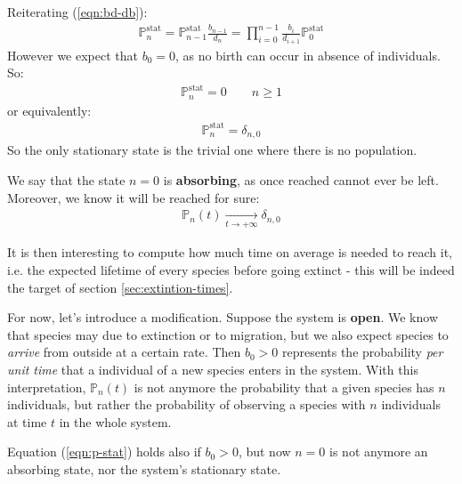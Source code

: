 \documentclass[../../main.tex]{subfiles}
\begin{document}
\medskip

Reiterating (\ref{eqn:bd-db}):
\begin{align}\label{eqn:p-stat}
    \mathbb{P}_{n}^{\mathrm{stat}} = \mathbb{P}_{n-1}^{\mathrm{stat}} \frac{b_{n-1}}{d_n} = \prod_{i=0}^{n-1} \frac{b_i}{d_{i+1}}   \mathbb{P}_0^{\mathrm{stat}}
\end{align}
However we expect that $b_0 = 0$, as no birth can occur in absence of individuals. So:
\begin{align*}
    \mathbb{P}_{n}^{\mathrm{stat}} = 0 \qquad n \geq 1
\end{align*}
or equivalently:
\begin{align*}
    \mathbb{P}_{n}^{\mathrm{stat}} = \delta_{n,0}
\end{align*}
So the only stationary state is the trivial one where there is no population.

\medskip

We say that the state $n=0$ is \textbf{absorbing}, as once reached cannot ever be left. Moreover, we know it will be reached for sure:
\begin{align*}
    \mathbb{P}_n(t)  \xrightarrow[t \to +\infty]{}  \delta_{n,0}
\end{align*}

It is then interesting to compute how much time on average is needed to reach it, i.e. the expected lifetime of every species before going extinct - this will be indeed the target of section \ref{sec:extintion-times}.

\medskip

For now, let's introduce a modification. Suppose the system is \textbf{open}. We know that species may  due to extinction or to migration, but we also expect species to \textit{arrive} from outside at a certain rate.
Then $b_0 > 0$ represents the probability \textit{per unit time} that a individual of a new species enters in the system. With this interpretation, $\mathbb{P}_n(t)$ is not anymore the probability that a given species has $n$ individuals, but rather the probability of observing a  species with $n$ individuals at time $t$ in the whole system. 

\medskip

Equation (\ref{eqn:p-stat}) holds also if $b_0 > 0$, but now $n=0$ is not anymore an absorbing state, nor the system's stationary state. 
\end{document}
